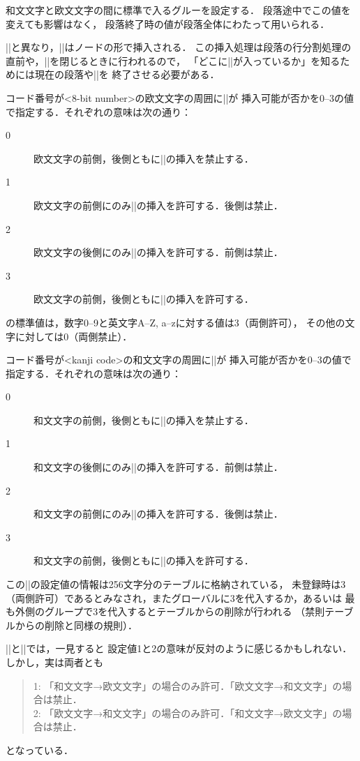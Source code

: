 \documentclass[a4paper,11pt,nomag,dvipdfmx]{jsarticle}
\begin{document}
\begin{cslist}
\csitem[\.{xkanjiskip}=<skip>]
  和文文字と欧文文字の間に標準で入るグルーを設定する．
  段落途中でこの値を変えても影響はなく，
  段落終了時の値が段落全体にわたって用いられる．
\end{cslist}
\begin{dangerous}
  |\kanjiskip|と異なり，|\xkanjiskip|はノードの形で挿入される．
  この挿入処理は段落の行分割処理の直前や，|\hbox|を閉じるときに行われるので，
  「どこに|\xkanjiskip|が入っているか」を知るためには現在の段落や|\hbox|を
  終了させる必要がある．
\end{dangerous}

\begin{cslist}
\csitem[\.{xspcode} <8-bit number>=<0--3>]
  コード番号が<8-bit number>の欧文文字の周囲に|\xkanjiskip|が
  挿入可能が否かを0--3の値で指定する．それぞれの意味は次の通り：
  \begin{description}
    \item[0] 欧文文字の前側，後側ともに|\xkanjiskip|の挿入を禁止する．
    \item[1] 欧文文字の前側にのみ|\xkanjiskip|の挿入を許可する．後側は禁止．
    \item[2] 欧文文字の後側にのみ|\xkanjiskip|の挿入を許可する．前側は禁止．
    \item[3] 欧文文字の前側，後側ともに|\xkanjiskip|の挿入を許可する．
  \end{description}
  \pTeX の標準値は，数字0--9と英文字A--Z, a--zに対する値は3（両側許可），
  その他の文字に対しては0（両側禁止）．

\csitem[\.{inhibitxspcode} <kanji code>=<0--3>]
  コード番号が<kanji code>の和文文字の周囲に|\xkanjiskip|が
  挿入可能が否かを0--3の値で指定する．それぞれの意味は次の通り：
  \begin{description}
    \item[0] 和文文字の前側，後側ともに|\xkanjiskip|の挿入を禁止する．
    \item[1] 和文文字の後側にのみ|\xkanjiskip|の挿入を許可する．前側は禁止．
    \item[2] 和文文字の前側にのみ|\xkanjiskip|の挿入を許可する．後側は禁止．
    \item[3] 和文文字の前側，後側ともに|\xkanjiskip|の挿入を許可する．
  \end{description}
  この|\inhibitxspcode|の設定値の情報は256文字分のテーブルに格納されている，
  未登録時は3（両側許可）であるとみなされ，またグローバルに3を代入するか，あるいは
  最も外側のグループで3を代入するとテーブルからの削除が行われる
  （禁則テーブルからの削除と同様の規則）．
\end{cslist}
\begin{dangerous}
  |\xspcode|と|\inhibitxspcode|では，一見すると
  設定値1と2の意味が反対のように感じるかもしれない．しかし，実は両者とも
  \begin{quote}
    1: 「和文文字→欧文文字」の場合のみ許可．「欧文文字→和文文字」の場合は禁止．\\
    2: 「欧文文字→和文文字」の場合のみ許可．「和文文字→欧文文字」の場合は禁止．
  \end{quote}
  となっている．
\end{dangerous}
\end{document}
